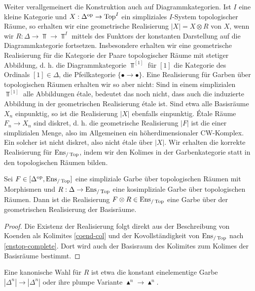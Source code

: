 Weiter verallgemeinert die Konstruktion auch auf
Diagrammkategorien. Ist $I$ eine kleine Kategorie und $X: \Delta^\mathrm{op}
\to \operatorname{Top}^I$ ein simpliziales $I$-System topologischer Räume, so
erhalten wir eine geometrische Realisierung $|X| = X \otimes R$ von
$X$, wenn wir $R: \Delta \to \Top \to \Top^I$ mittels des Funktors der
konstanten Darstellung auf die Diagrammkategorie
fortsetzen. Insbesondere erhalten wir eine geometrische Realisierung
für die Kategorie der Paare topologischer Räume mit stetiger
Abbildung, d. h. die Diagrammkategorie $\Top^{[1]}$ für $[1]$ die
Kategorie des Ordinals $[1] \in \Delta$, die Pfeilkategorie $\{
\bullet \to \bullet \}$. Eine Realisierung für Garben über
topologischen Räumen erhalten wir so aber nicht: Sind in einem
simplizialen $\Top^{[1]}$ alle Abbildungen étale, bedeutet das noch
nicht, dass auch die induzierte Abbildung in der geometrischen
Realisierung étale ist. Sind etwa alle Basisräume $X_n$ einpunktig, so
ist die Realisierung $|X|$ ebenfalls einpunktig. Étale Räume $F_n \to
X_n$ sind diskret, d. h. die geometrische Realisierung $|F|$ ist die
einer simplizialen Menge, also im Allgemeinen ein höherdimensionaler
CW-Komplex. Ein solcher ist nicht diskret, also nicht étale über
$|X|$. Wir erhalten die korrekte Realisierung für $\operatorname{Ens}_{/\operatorname{Top}}$,
indem wir den Kolimes in der Garbenkategorie statt in den
topologischen Räumen bilden.
\begin{prop}
  Sei $F \in [\Delta^\mathrm{op}, \operatorname{Ens}_{/\operatorname{Top}}]$ eine simpliziale Garbe über
  topologischen Räumen mit Morphismen und $R: \Delta \to \operatorname{Ens}_{/\operatorname{Top}}$
  eine kosimpliziale Garbe über topologischen Räumen. Dann ist die
  Realisierung $F \otimes R \in \operatorname{Ens}_{/\operatorname{Top}}$ eine Garbe über der
  geometrischen Realisierung der Basisräume.
\end{prop}
\begin{proof} \label{real-enstop}
  Die Existenz der Realisierung folgt direkt aus der Beschreibung von
  Koenden als Kolimites \ref{coend-col} und der Kovollständigkeit von
  $\operatorname{Ens}_{/\operatorname{Top}}$ nach \ref{enstop-complete}. Dort wird auch der
  Basisraum des Kolimites zum Kolimes der Basisräume bestimmt.
\end{proof}
\begin{bem}
  Eine kanonische Wahl für $R$ ist etwa die konstant einelementige
  Garbe $|\Delta^n| \to |\Delta^n|$ oder ihre plumpe Variante
  $\blacktriangle^n \to \blacktriangle^n$.
\end{bem}
